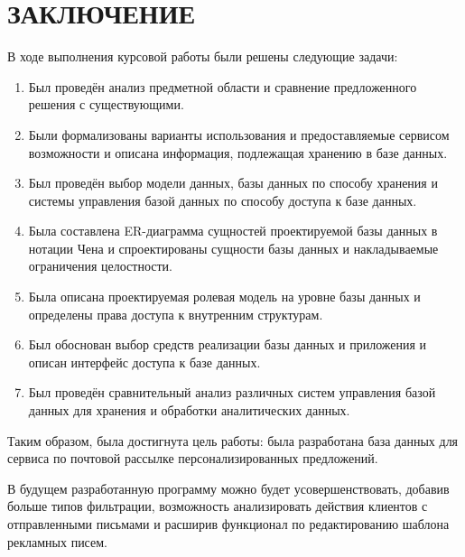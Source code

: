 \chapter*{ЗАКЛЮЧЕНИЕ}

В ходе выполнения курсовой работы были решены следующие задачи:
\begin{enumerate}
	\item Был проведён анализ предметной области и сравнение предложенного решения с существующими.
	\item Были формализованы варианты использования и предоставляемые сервисом возможности и описана информация, подлежащая хранению в базе данных.
	\item Был проведён выбор модели данных, базы данных по способу хранения и системы управления базой данных по способу доступа к базе данных.
	\item Была составлена ER-диаграмма сущностей проектируемой базы данных в нотации Чена и спроектированы сущности базы данных и накладываемые ограничения целостности.
	\item Была описана проектируемая ролевая модель на уровне базы данных и определены права доступа к внутренним структурам.
	\item Был обоснован выбор средств реализации базы данных и приложения и описан интерфейс доступа к базе данных.
	\item Был проведён сравнительный анализ различных систем управления базой данных для хранения и обработки аналитических данных.
\end{enumerate}

Таким образом, была достигнута цель работы: была разработана база данных для сервиса по почтовой рассылке персонализированных предложений.

В будущем разработанную программу можно будет усовершенствовать, добавив больше типов фильтрации, возможность анализировать действия клиентов с отправленными письмами и расширив функционал по редактированию шаблона рекламных писем.